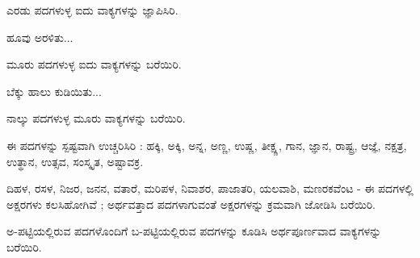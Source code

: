 \vspace{2.5pt plus 3pt minus 0.5pt}\noindent\hspace*{1.2em}\hspace{0.55em}ಎರಡು ಪದಗಳುಳ್ಳ  ಐದು ವಾಕ್ಯಗಳನ್ನು ಜ್ಞಾಪಿಸಿರಿ.\par

\noindent\hspace*{1.2em}\hspace{0.6em}ಹೂವು ಅರಳಿತು...\par

\vspace{2.5pt plus 3pt minus 0.5pt}\noindent\hspace*{1.2em}\hspace{0.55em}ಮೂರು ಪದಗಳುಳ್ಳ ಐದು ವಾಕ್ಯಗಳನ್ನು ಬರೆಯಿರಿ.\par

\noindent\hspace*{1.2em}\hspace{0.6em}ಬೆಕ್ಕು ಹಾಲು ಕುಡಿಯಿತು...\par

\vspace{2.5pt plus 3pt minus 0.5pt}\noindent\hspace*{1.2em}\hspace{0.55em}ನಾಲ್ಕು ಪದಗಳುಳ್ಳ ಮೂರು ವಾಕ್ಯಗಳನ್ನು ಬರೆಯಿರಿ.\par

\vspace{2.5pt plus 3pt minus 0.5pt}\noindent\hspace*{1.2em}\hspace{0.55em}ಈ ಪದಗಳನ್ನು ಸ್ಪಷ್ಟವಾಗಿ ಉಚ್ಚರಿಸಿರಿ : ಹಕ್ಕಿ, ಅಕ್ಕಿ, ಅನ್ನ, ಅಣ್ಣ, ಉಷ್ಣ, ತೀಕ್ಷ್ಣ, ಗಾನ, ಜ್ಞಾನ, ರಾಷ್ಟ್ರ, ಆಜ್ಞೆ, ನಕ್ಷತ್ರ, ಉತ್ಥಾನ, ಉತ್ಸವ, ಸಂಸ್ಕೃತ, ಅಷ್ಟಾವಕ್ರ.\par

\vspace{2.5pt plus 3pt minus 0.5pt}\noindent\hspace*{1.2em}\hspace{0.55em}ದಿಹಳ, ರಸಳ, ನಿಜರ, ಜನನ, ವತಾರೆ, ಮರಿಪಳ, ನಿವಾಶರ, ಪಾಜಾತರಿ, ಯಲವಾಶಿ, ಮಣರಕವೆಂಟ  - ಈ ಪದಗಳಲ್ಲಿ ಅಕ್ಷರಗಳು ಕಲಸಿಹೋಗಿವೆ ; ಅರ್ಥವತ್ತಾದ ಪದಗಳಾಗುವಂತೆ ಅಕ್ಷರಗಳನ್ನು ಕ್ರಮವಾಗಿ ಜೋಡಿಸಿ ಬರೆಯಿರಿ.\par

\vspace{2.5pt plus 3pt minus 0.5pt}\noindent\hspace*{1.2em}\hspace{0.55em}ಅ-ಪಟ್ಟಿಯಲ್ಲಿರುವ ಪದಗಳೊಂದಿಗೆ ಬ-ಪಟ್ಟಿಯಲ್ಲಿರುವ ಪದಗಳನ್ನು ಕೂಡಿಸಿ ಅರ್ಥಪೂರ್ಣವಾದ ವಾಕ್ಯಗಳನ್ನು ಬರೆಯಿರಿ.\par

